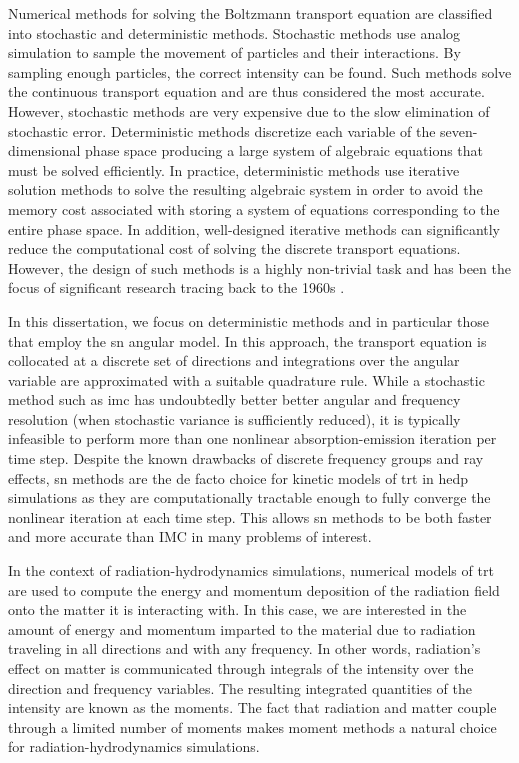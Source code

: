 \documentclass[../doc.tex]{subfiles}
\begin{document}
Numerical methods for solving the Boltzmann transport equation are classified into stochastic and deterministic methods. Stochastic methods use analog simulation to sample the movement of particles and their interactions. By sampling enough particles, the correct intensity can be found. Such methods solve the continuous transport equation and are thus considered the most accurate. However, stochastic methods are very expensive due to the slow elimination of stochastic error.
Deterministic methods discretize each variable of the seven-dimensional phase space producing a large system of algebraic equations that must be solved efficiently. In practice, deterministic methods use iterative solution methods to solve the resulting algebraic system in order to avoid the memory cost associated with storing a system of equations corresponding to the entire phase space. In addition, well-designed iterative methods can significantly reduce the computational cost of solving the discrete transport equations. However, the design of such methods is a highly non-trivial task and has been the focus of significant research tracing back to the 1960s \cite{AL}. 

In this dissertation, we focus on deterministic methods and in particular those that employ the \gls{sn} angular model. In this approach, the transport equation is collocated at a discrete set of directions and integrations over the angular variable are approximated with a suitable quadrature rule. While a stochastic method such as \gls{imc} \cite{2001JCoPh.172..543G} has undoubtedly better better angular and frequency resolution (when stochastic variance is sufficiently reduced), it is typically infeasible to perform more than one nonlinear absorption-emission iteration per time step. Despite the known drawbacks of discrete frequency groups and ray effects, \gls{sn} methods are the de facto choice for kinetic models of \gls{trt} in \gls{hedp} simulations as they are computationally tractable enough to fully converge the nonlinear iteration at each time step. This allows \gls{sn} methods to be both faster and more accurate than IMC in many problems of interest. 

In the context of radiation-hydrodynamics simulations, numerical models of \gls{trt} are used to compute the energy and momentum deposition of the radiation field onto the matter it is interacting with. In this case, we are interested in the amount of energy and momentum imparted to the material due to radiation traveling in all directions and with any frequency. In other words, radiation's effect on matter is communicated through integrals of the intensity over the direction and frequency variables. The resulting integrated quantities of the intensity are known as the moments. The fact that radiation and matter couple through a limited number of moments makes moment methods a natural choice for radiation-hydrodynamics simulations. 
\end{document}
